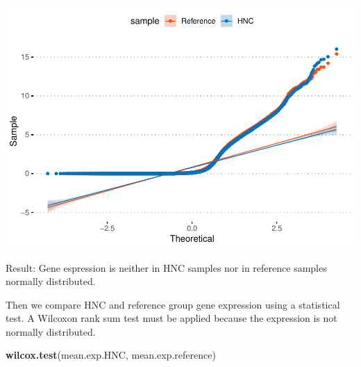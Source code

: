 \documentclass[]{article}
\newenvironment{Shaded}{\begin{snugshade}}{\end{snugshade}}
\newcommand{\KeywordTok}[1]{\textcolor[rgb]{0.13,0.29,0.53}{\textbf{#1}}}
\newcommand{\DataTypeTok}[1]{\textcolor[rgb]{0.13,0.29,0.53}{#1}}
\newcommand{\StringTok}[1]{\textcolor[rgb]{0.31,0.60,0.02}{#1}}
\newcommand{\CommentTok}[1]{\textcolor[rgb]{0.56,0.35,0.01}{\textit{#1}}}
\newcommand{\NormalTok}[1]{#1}
\begin{document}
\begin{Shaded}
\end{Shaded}

\includegraphics{Project_HNC_files/figure-latex/1_expression_values3-1.pdf}

Result: Gene espression is neither in HNC samples nor in reference
samples normally distributed.

Then we compare HNC and reference group gene expression using a
statistical test. A Wilcoxon rank sum test must be applied because the
expression is not normally distributed.

\begin{Shaded}
\begin{Highlighting}[]
\KeywordTok{wilcox.test}\NormalTok{(mean.exp.HNC, mean.exp.reference)}
\end{Highlighting}
\end{Shaded}
\end{document}
